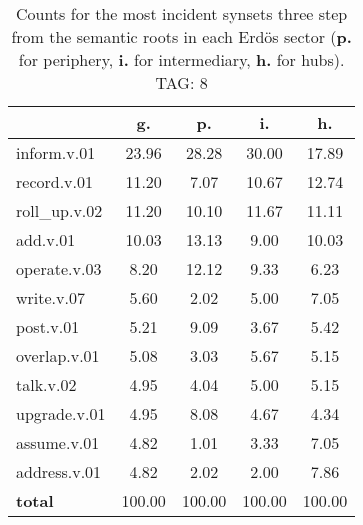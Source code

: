 \begin{table}[h!]
\begin{center}
\begin{tabular}{| l || c | c | c | c |}\hline
 & {\bf g.} & {\bf p.} & {\bf i.} & {\bf h.} \\\hline\hline
inform.v.01 & 23.96  & 28.28  & 30.00  & 17.89 \\\hline
record.v.01 & 11.20  & 7.07  & 10.67  & 12.74 \\\hline
roll\_up.v.02 & 11.20  & 10.10  & 11.67  & 11.11 \\\hline
add.v.01 & 10.03  & 13.13  & 9.00  & 10.03 \\\hline
operate.v.03 & 8.20  & 12.12  & 9.33  & 6.23 \\\hline
write.v.07 & 5.60  & 2.02  & 5.00  & 7.05 \\\hline
post.v.01 & 5.21  & 9.09  & 3.67  & 5.42 \\\hline
overlap.v.01 & 5.08  & 3.03  & 5.67  & 5.15 \\\hline
talk.v.02 & 4.95  & 4.04  & 5.00  & 5.15 \\\hline
upgrade.v.01 & 4.95  & 8.08  & 4.67  & 4.34 \\\hline
assume.v.01 & 4.82  & 1.01  & 3.33  & 7.05 \\\hline
address.v.01 & 4.82  & 2.02  & 2.00  & 7.86 \\\hline\hline
{{\bf total}} & 100.00  & 100.00  & 100.00  & 100.00 \\\hline
\end{tabular}
\caption{Counts for the most incident synsets three step from the semantic roots in each Erd\"os sector ({\bf p.} for periphery, {\bf i.} for intermediary, {\bf h.} for hubs). TAG: 8}
\end{center}
\end{table}